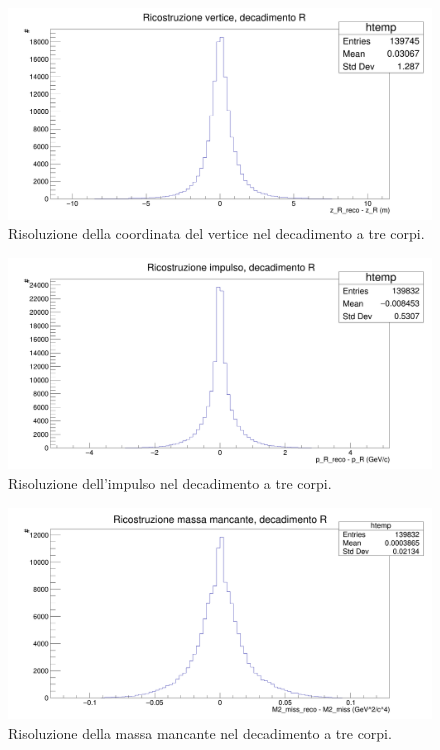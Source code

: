 \documentclass[8pt]{extarticle}
\begin{document}
\begin{figure}[!h]
\begin{center}
\includegraphics[scale=0.25]{reco_z_R}
\caption{Risoluzione della coordinata del vertice nel decadimento a tre corpi.}
\label{fig:reco_z_R}
\end{center}
\end{figure}

\begin{figure}[!h]
\begin{center}
\includegraphics[scale=0.25]{reco_p_R}
\caption{Risoluzione dell'impulso nel decadimento a tre corpi.}
\label{fig:reco_p_R}
\end{center}
\end{figure}

\begin{figure}[!h]
\begin{center}
\includegraphics[scale=0.25]{reco_miss_R}
\caption{Risoluzione della massa mancante nel decadimento a tre corpi.}
\label{fig:reco_miss_R}
\end{center}
\end{figure}
\end{document}
